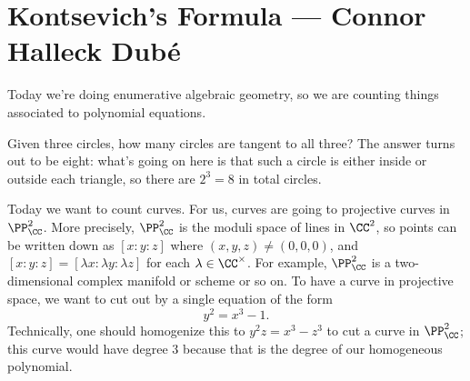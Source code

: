 \documentclass{article}
\begin{document}
\section{Kontsevich's Formula --- Connor Halleck Dub\'e}
Today we're doing enumerative algebraic geometry, so we are counting things associated to polynomial equations.
\begin{example}[Apollonius]
	Given three circles, how many circles are tangent to all three? The answer turns out to be eight: what's going on here is that such a circle is either inside or outside each triangle, so there are $2^3=8$ in total circles.
\end{example}
Today we want to count curves. For us, curves are going to projective curves in $\PP^2_\CC$. More precisely, $\PP^2_\CC$ is the moduli space of lines in $\CC^2$, so points can be written down as $[x:y:z]$ where $(x,y,z)\ne(0,0,0)$, and $[x:y:z]=[\lambda x:\lambda y:\lambda z]$ for each $\lambda\in\CC^\times$. For example, $\PP^2_\CC$ is a two-dimensional complex manifold or scheme or so on. To have a curve in projective space, we want to cut out by a single equation of the form
\[y^2=x^3-1.\]
Technically, one should homogenize this to $y^2z=x^3-z^3$ to cut a curve in $\PP^2_\CC$; this curve would have degree $3$ because that is the degree of our homogeneous polynomial.
\end{document}
